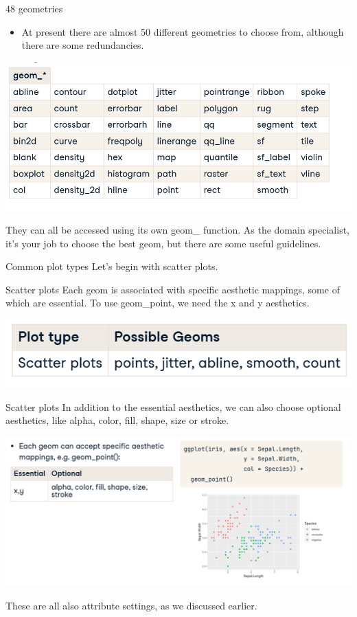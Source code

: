 \documentclass[
  ignorenonframetext,
]{beamer}
\providecommand{\tightlist}{%
  \setlength{\itemsep}{0pt}\setlength{\parskip}{0pt}}
\begin{document}
\begin{frame}{48 geometries}
\label{geometries-2}
\begin{itemize}
\tightlist
\item
  At present there are almost 50 different geometries to choose from,
  although there are some redundancies.
\end{itemize}

\includegraphics{../images/im183.png}

They can all be accessed using its own geom\_ function. As the domain
specialist, it's your job to choose the best geom, but there are some
useful guidelines.
\end{frame}

\begin{frame}{Common plot types}
\label{common-plot-types}
Let's begin with scatter plots.
\end{frame}

\begin{frame}{Scatter plots}
\label{scatter-plots-1}
Each geom is associated with specific aesthetic mappings, some of which
are essential. To use geom\_point, we need the x and y aesthetics.

\includegraphics{../images/im184.png}
\end{frame}

\begin{frame}{Scatter plots}
\label{scatter-plots-2}
In addition to the essential aesthetics, we can also choose optional
aesthetics, like alpha, color, fill, shape, size or stroke.

\includegraphics{../images/im185.png}

These are all also attribute settings, as we discussed earlier.
\end{frame}
\end{document}
